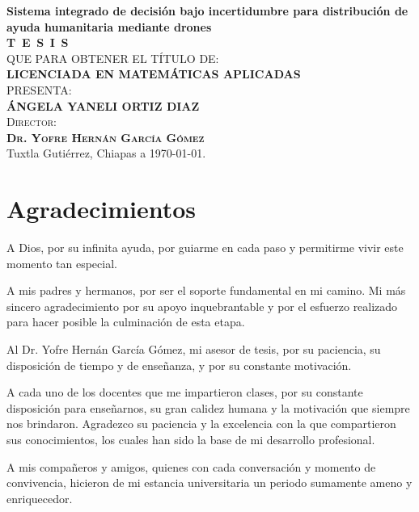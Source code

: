 \documentclass[
  spanish,
  us-letterpaper,
]{scrreprt}
\numberwithin{equation}{section}
\begin{document}
\begin{titlepage}
\begin{minipage}[t][0.95\textheight][c]{0.76\textwidth}
            \begin{center}
                {\Large\bfseries Sistema integrado de decisión bajo incertidumbre para distribución de ayuda humanitaria mediante drones}\\[2cm]
                \textsc{\huge \textbf{T\, E\, S\, I\, S}}\\[1.5cm]
                \textsc{\large QUE PARA OBTENER EL TÍTULO DE:}\\[0.3cm]
                \textbf{\textsc{LICENCIADA EN MATEMÁTICAS APLICADAS}}\\[1.5cm]
                \textsc{\large PRESENTA:}\\[0.3cm]
                \textbf{\textsc{\large {ÁNGELA YANELI ORTIZ DIAZ}}}\\[2cm]
                {\large\scshape Director:\\[0.3cm]
                {\textbf{\large Dr. Yofre Hernán García Gómez }}}\\[2.0cm]
                \large{Tuxtla Gutiérrez, Chiapas a \today.}

            \end{center}
\end{minipage}
\end{titlepage}

\pagebreak[2]

\chapter*{Agradecimientos}

A Dios, por su infinita ayuda, por guiarme en cada paso y permitirme vivir este momento tan especial.

A mis padres y hermanos, por ser el soporte fundamental en mi camino. Mi más sincero agradecimiento por su apoyo inquebrantable y por el esfuerzo realizado para hacer posible la culminación de esta etapa.

Al Dr. Yofre Hernán García Gómez, mi asesor de tesis, por su paciencia, su disposición de tiempo y de enseñanza, y por su constante motivación.

A cada uno de los docentes que me impartieron clases, por su constante disposición para enseñarnos, su gran calidez humana y la motivación que siempre nos brindaron. Agradezco su paciencia y la excelencia con la que compartieron sus conocimientos, los cuales han sido la base de mi desarrollo profesional.

A mis compañeros y amigos, quienes con cada conversación y momento de convivencia, hicieron de mi estancia universitaria un periodo sumamente ameno y enriquecedor.
\end{document}
